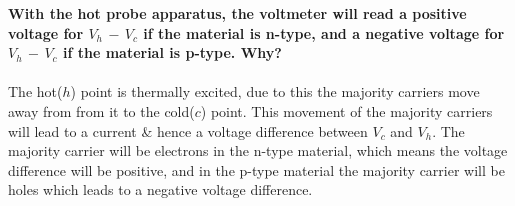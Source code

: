 \footnotesize{
\textbf{With the hot probe apparatus, the voltmeter will read a positive voltage for $V_h\,-\,V_{c}$ if the material is n-type, and a negative voltage for $V_h\,-\,V_{c}$ if the material is p-type. Why?}
}
\normalsize
\\ \\ 
The hot($h$) point is thermally excited, due to this the majority carriers move away from from it to the cold($c$) point. This movement of the majority carriers will lead to a current \& hence a voltage difference between $V_c$ and $V_h$. The majority carrier will be electrons in the n-type material, which means the voltage difference will be positive, and in the p-type material the majority carrier will be holes which leads to a negative voltage difference.
